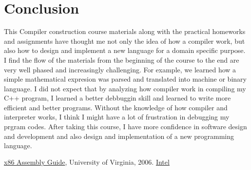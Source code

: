 \documentclass{article}
\theoremstyle{theorem}
\theoremstyle{definition}
\theoremstyle{remark}
\begin{document}
\section{Conclusion}
This Compiler construction course materials along with the practical homeworks and assignments have thought me not only the idea of how a compiler work, but also how to design and implement a new language for a domain specific purpose. I find the flow of the materials from the beginning of the course to the end are very well phased and increasingly challenging.  For example, we learned how a simple mathematical expresion was parsed and translated into machine or binary language. I did not expect that by analyzing how compiler work in compiling my C++ program, I learned a better debbuggin skill and learned to write more efficient and better programs. Without the knowledge of how compiler and interpreter works, I think I might have a lot of frustration in debugging my prgram codes. After taking this course, I have  more confidence in software design and development and also design and implementation of a new programming language.  


\begin{thebibliography}{99}
 \href{https://www.cs.virginia.edu/~evans/cs216/guides/x86.html#instructions}{x86 Assembly Guide}, University of Virginia, 2006.
 \href{https://www.intel.com/content/dam/develop/public/us/en/documents/325383-sdm-vol-2abcd.pdf}{Intel}
\end{thebibliography}
\end{document}
